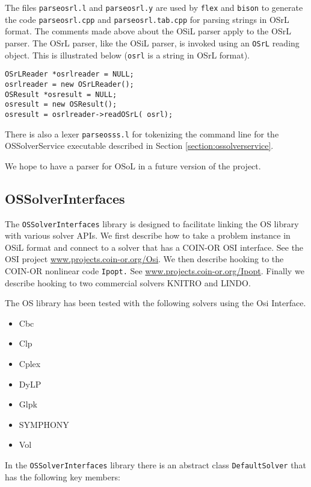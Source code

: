 \documentclass[11pt]{article}
\renewcommand{\_}{{\char"5F}}
\renewcommand{\{}{{\char"7B}}
\renewcommand{\}}{{\char"7D}}
\renewcommand{\^}{{\char"0D}}
\renewcommand{\'}{{\char"0D}}
\begin{document}
The files {\tt parseosrl.l} and {\tt parseosrl.y} are used by {\tt flex} and {\tt bison} to  generate the code {\tt parseosrl.cpp} and {\tt parseosrl.tab.cpp} for parsing strings in OSrL format. The comments made above about the OSiL parser apply to the OSrL parser. The OSrL parser, like the OSiL parser, is invoked using an {\tt OSrL} reading object. This is illustrated below ({\tt osrl} is a string in OSrL format).
\begin{verbatim}
OSrLReader *osrlreader = NULL;
osrlreader = new OSrLReader();
OSResult *osresult = NULL;
osresult = new OSResult(); 
osresult = osrlreader->readOSrL( osrl);
\end{verbatim}

There is also a lexer {\tt parseosss.l} for tokenizing the command line for the OSSolverService executable described in Section \ref{section:ossolverservice}.

We hope to have a parser for OSoL  in a future version of the project. 


\subsection{OSSolverInterfaces}\label{section:ossolverinterfaces}


The {\tt OSSolverInterfaces} library is designed to facilitate linking the OS library with various solver APIs. We first describe how to take a problem instance in OSiL format and connect to a solver that has a COIN-OR OSI interface.  See the OSI project \url{www.projects.coin-or.org/Osi}.   We then describe hooking to the COIN-OR nonlinear code {\tt Ipopt.} See \url{www.projects.coin-or.org/Ipopt}.  Finally we describe hooking to two commercial solvers KNITRO and LINDO. 

The OS library has been tested with the following solvers using the Osi Interface.

\begin{itemize}
\item Cbc
\item Clp
\item Cplex
\item DyLP
\item Glpk
\item SYMPHONY
\item Vol
\end{itemize}

In the {\tt OSSolverInterfaces} library there is an abstract class {\tt DefaultSolver} that has the following key members:
\end{document}
